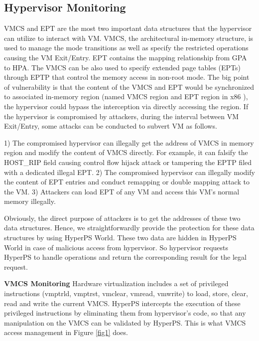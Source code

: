 \documentclass[conference]{IEEEtran}
\begin{document}
\subsection{Hypervisor Monitoring}\label {interaction}

 VMCS and EPT are the most two important data structures that the hypervisor can utilize to interact with VM. %
VMCS, the architectural in-memory structure, is used to manage the mode transitions as well as specify the restricted operations causing the VM Exit/Entry. EPT contains the mapping relationship from GPA to HPA. The VMCS can be also used to specify extended page tables (EPTs) through EPTP that control the memory access in non-root mode.
The big point of vulnerability is that the content of the VMCS and EPT would be synchronized to associated in-memory region (named VMCS region and EPT region in x86 ), the hypervisor could bypass the interception via directly accessing the region.
If the hypervisor is compromised by attackers, during the interval between VM Exit/Entry, some attacks can be conducted to subvert VM as follows. 


1) The compromised hypervisor can illegally get the address of VMCS in memory region and modify the content of VMCS directly. For example, it can falsify the HOST\_RIP field causing control flow hijack attack or tampering the EPTP filed with a dedicated illegal EPT.
2) The compromised hypervisor can illegally modify the content of EPT entries
and conduct remapping or double mapping attack to the VM.
3) Attackers can load EPT of any VM and access this VM's normal memory illegally.

Obviously, the direct purpose of attackers is to get the addresses of these two data structures.
Hence, we straightforwardly provide the protection for these data structures by using HyperPS World. These two data are hidden in HyperPS World in case of malicious access from hypervisor. 
So hypervisor requests HyperPS to handle operations and return the corresponding result for the legal request. 

\textbf{VMCS Monitoring}
Hardware virtualization includes a set of privileged instructions (vmptrld, vmptrst, vmclear, vmread, vmwrite) to load, store, clear, read and write the current VMCS. HyperPS intercepts the execution of these
privileged instructions by eliminating them from hypervisor's code, so that any manipulation on the VMCS can be validated by HyperPS. This is what VMCS access management in Figure \ref{fig1} does.
\end{document}
